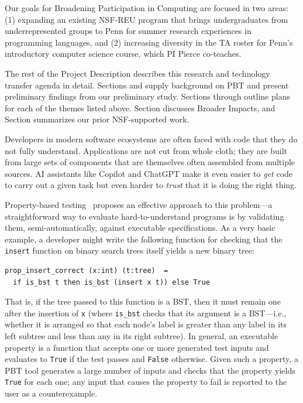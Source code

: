 %
Our goals for Broadening Participation in Computing are focused in two
areas: (1) expanding an
existing NSF-REU program that brings undergraduates from
underrepresented groups to Penn for summer research experiences in
programming languages, and (2) increasing diversity in the TA roster
for Penn's introductory computer science course, which PI Pierce
co-teaches.

\medskip

The rest of the Project Description describes this research and
technology transfer agenda in detail.  Sections
 and  supply
background on PBT and present preliminary findings from our
preliminary study.
%
Sections  through
 outline plans for each of the
themes listed above.
Section 
discusses Broader Impacts, and
Section  summarizes our prior
NSF-supported work.

Developers in modern software ecosystems are often faced with code
that they do not fully understand. Applications are not cut from whole cloth;
they are built from large sets of components that are themselves often
assembled from multiple sources.
AI assistants like Copilot and ChatGPT make it even
easier to {\em get} code to carry out a given task but even harder to
{\em trust} that it is doing the right thing.

Property-based testing~\cite{hughes_quickcheck_2007} proposes an
effective approach to this problem---a straightforward way to evaluate
hard-to-understand programs is by validating them, semi-automatically,
against executable specifications. As a very basic example, a
developer might write the following function for checking that
the \lstinline{insert} function on binary search trees itself yields a new
binary tree:
\begin{lstlisting}
prop_insert_correct (x:int) (t:tree)  =
  if is_bst t then is_bst (insert x t)) else True
\end{lstlisting}
That is, if the tree passed to this function
is a BST, then it must remain
one after the insertion of \texttt{x} (where
\lstinline{is_bst} checks that its argument is a BST---i.e., whether it
is arranged so that each node's label is greater
than any label in its left subtree and less than any in its right
subtree).
%
In general, an executable property is a function that
accepts one or more generated
test inputs
and evaluates to \lstinline{True} if the test passes and
\lstinline{False} otherwise.
Given such a property, a PBT tool generates a
large number of inputs and
checks that the property yields \lstinline{True} for each one; any input
that causes the property to fail is reported to the user as a
{counterexample}.
%

